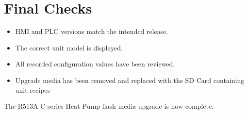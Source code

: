 \documentclass[11pt]{article}
\newcommand{\ProductDescription}{R513A C-series Heat Pump}
\newcommand{\RecipeFolder}{\texttt{\{unit\}\_RECIPES}}
\begin{document}
\section*{Final Checks}

\begin{itemize}
  \item HMI and PLC versions match the intended release.
  \item The correct unit model is displayed.
  \item All recorded configuration values have been reviewed.
  \iftoggle{HasRecipes}{\item The correct \RecipeFolder{} contents are installed.}{}
  \item Upgrade media has been removed and replaced with the SD Card containing unit recipes
        
\end{itemize}

The \ProductDescription{} flash-media upgrade is now complete.
\end{document}
